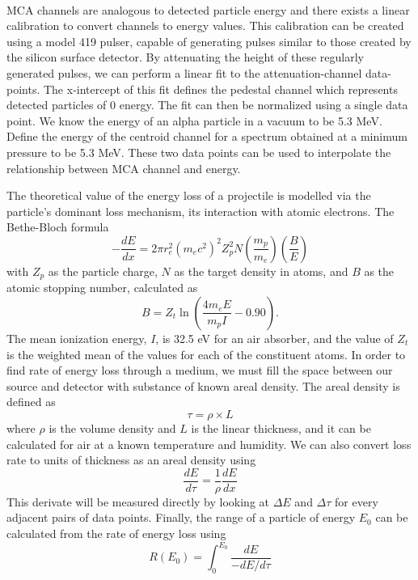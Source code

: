 \documentclass[12pt]{article}
\begin{document}
\begin{multicols}{2}
    \paragraph{} MCA channels are analogous to detected particle energy and there exists a linear calibration to convert channels to energy values. This calibration can be created using a model 419 pulser, capable of generating pulses similar to those created by the silicon surface detector. By attenuating the height of these regularly generated pulses, we can perform a linear fit to the attenuation-channel data-points. The x-intercept of this fit defines the pedestal channel which represents detected particles of 0 energy. The fit can then be normalized using a single data point. We know the energy of an alpha particle in a vacuum to be 5.3 MeV. Define the energy of the centroid channel for a spectrum obtained at a minimum pressure to be 5.3 MeV. These two data points can be used to interpolate the relationship between MCA channel and energy. \cite{kovash}

    The theoretical value of the energy loss of a projectile is modelled via the particle's dominant loss mechanism, its interaction with atomic electrons. The Bethe-Bloch formula
    \begin{equation}
        -\frac{dE}{dx} = 2\pi r_e^2(m_ec^2)^2Z_p^2N\left(\frac{m_p}{m_e}\right)\left(\frac{B}{E}\right)
        \label{bethebloch}
    \end{equation}
    with $Z_p$ as the particle charge, $N$ as the target density in atoms, and $B$ as the atomic stopping number, calculated as
    $$B = Z_t\ln\left(\frac{4m_eE}{m_pI} - 0.90\right).$$
    The mean ionization energy, $I$, is 32.5 eV for an air absorber, and the value of $Z_t$ is the weighted mean of the values for each of the constituent atoms.
    In order to find rate of energy loss through a medium, we must fill the space between our source and detector with substance of known areal density. The areal density is defined as
    \begin{equation}
        \tau = \rho \times L
        \label{areal}
    \end{equation}
    where $\rho$ is the volume density and $L$ is the linear thickness, and it can be calculated for air at a known temperature and humidity. We can also convert loss rate to units of thickness as an areal density using 
    \begin{equation}
        \frac{dE}{d\tau} = \frac{1}{\rho}\frac{dE}{dx}
        \label{arealConversion}
    \end{equation}
    This derivate will be measured directly by looking at $\Delta E$ and $\Delta \tau$ for every adjacent pairs of data points.
    Finally, the range of a particle of energy $E_0$ can be calculated from the rate of energy loss using 
    \begin{equation}
        R(E_0) = \int_0^{E_0} \frac{dE}{-dE/d\tau}
        \label{range}
    \end{equation}


    
    
\end{multicols}
\end{document}
